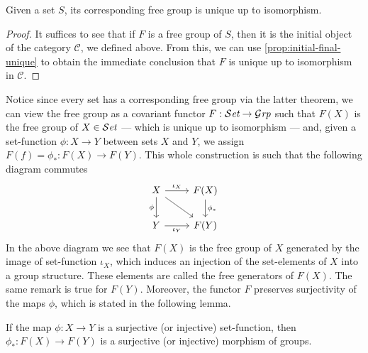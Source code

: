 \begin{corollary}\label{cor:free-group-unique-iso}
Given a set \(S\), its corresponding free group is unique up to isomorphism.
\end{corollary}

\begin{proof}
It suffices to see that if \(F\) is a free group of \(S\), then it is the
initial object of the category \(\mathcal C\), we defined above. From this, we
can use \cref{prop:initial-final-unique} to obtain the immediate conclusion that
\(F\) is unique up to isomorphism in \(\mathcal C\).
\end{proof}


Notice since every set has a corresponding free group via the latter theorem, we
can view the free group as a covariant functor \(F: {\mathcal{S}\textit{et}} \to {\mathcal{G}\textit{rp}}\) such that
\(F(X)\) is the free group of \(X \in {\mathcal{S}\textit{et}}\) --- which is unique up to isomorphism ---
and, given a set-function \(\phi: X \to Y\) between sets \(X\) and \(Y\), we assign
\(F(f) = \phi_{*}: F(X) \to F(Y)\). This whole construction is such that the
following diagram commutes
\begin{equation}\label{eq:free-functor}
  \begin{tikzcd}
    X \ar[r, "\iota_X"] \ar[d, swap, "\phi"] \ar[dr]
    &F(X) \ar[d, "\phi_{*}"] \\
    Y \ar[r, swap, "\iota_Y"] &F(Y)
  \end{tikzcd}
\end{equation}
In the above diagram we see that \(F(X)\) is the free group of \(X\) generated
by the image of set-function \(\iota_X\), which induces an injection of the
set-elements of \(X\) into a group structure. These elements are called the free
generators of \(F(X)\). The same remark is true for \(F(Y)\). Moreover, the
functor \(F\) preserves surjectivity of the maps \(\phi\), which is stated in the
following lemma.

\begin{lemma}\label{lem:free-func-preserves-inj-sur}
If the map \(\phi: X \to Y\) is a surjective (or injective) set-function, then
\(\phi_{*}: F(X) \to F(Y)\) is a surjective (or injective) morphism of groups.
\end{lemma}

